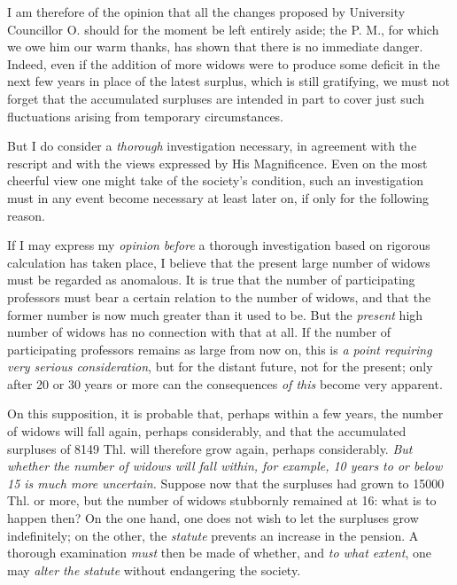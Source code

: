 \par{}
I am therefore of the opinion that all the changes proposed by University Councillor O. should for the moment be left entirely aside; the P. M., for which we owe him our warm thanks, has shown that there is no immediate danger. Indeed, even if the addition of more widows were to produce some deficit in the next few years in place of the latest surplus, which is still gratifying, we must not forget that the accumulated surpluses are intended in part to cover just such fluctuations arising from temporary circumstances.

But I do consider a \textit{thorough} investigation necessary, in agreement with the rescript and with the views expressed by His Magnificence. Even on the most cheerful view one might take of the society's condition, such an investigation must in any event become necessary at least later on, if only for the following reason.

If I may express my \textit{opinion} \textit{before} a thorough investigation based on rigorous calculation has taken place, I believe that the present large number of widows must be regarded as anomalous. It is true that the number of participating professors must bear a certain relation to the number of widows, and that the former number is now much greater than it used to be. But the \textit{present} high number of widows has no connection with that at all. If the number of participating professors remains as large from now on, this is \textit{a point requiring very serious consideration}, but for the distant future, not for the present; only after 20 or 30 years or more can the consequences \textit{of this} become very apparent.

On this supposition, it is probable that, perhaps within a few years, the number of widows will fall again, perhaps considerably, and that the accumulated surpluses of 8149 Thl. will therefore grow again, perhaps considerably. \textit{But whether the number of widows will fall within, for example, \textup{10} years to or below \textup{15} is much more uncertain.} Suppose now that the surpluses had grown to 15000 Thl. or more, but the number of widows stubbornly remained at 16: what is to happen then? On the one hand, one does not wish to let the surpluses grow indefinitely; on the other, the \textit{statute} prevents an increase in the pension. A thorough examination \textit{must} then be made of whether, and \textit{to what extent}, one may \textit{alter the statute} without endangering the society.

